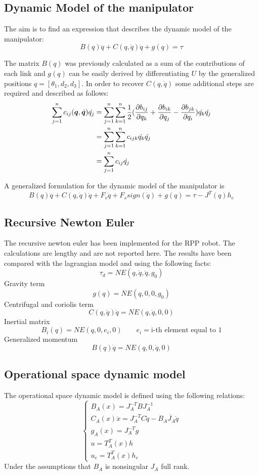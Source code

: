 \documentclass[a4paper,12pt]{article}
\newcommand*{\q}{\bm{q}}
\newcommand*{\dotq}{\dot{\q}}
\begin{document}
\subsection{Dynamic Model of the manipulator}
The aim is to find an expression that describes the dynamic model of the manipulator:
\[
    B(q)\ddot{q} + C(q, \dot{q})\dot{q} + g(q) = \tau
\]

\noindent The matrix $B(q)$ was previously calculated as a sum of the contributions of each link and $g(q)$ can be easily derived by differentiating $U$ by the generalized positions $q = [\theta_1,d_2, d_3]$. In order to recover $C(q,\dot{q})$ some additional steps are required and described as follows:
\begin{equation}
    \begin{aligned}
        \sum_{j=1}^{n} c_{ij}(\q, \dotq)\dot{q_j}  &= \sum_{j=1}^{n}\sum_{k=1}^{n} \frac{1}{2} (\pdv{b_{ij}}{q_k}+\pdv{b_{ik}}{q_j}-\pdv{b_{jk}}{q_i})\dot{q_k}\dot{q_j} \\
         &= \sum_{j=1}^{n}\sum_{k=1}^{n} c_{ijk}\dot{q_k}\dot{q_j} \\
         &= \sum_{j=1}^{n} c_{ij}\dot{q_j}
    \end{aligned}
\end{equation}

\noindent A generalized formulation for the dynamic model of the manipulator is
\[
    B(q)\ddot{q} + C(q, \dot{q})\dot{q} + F_v\dot{q} + F_ssign(\dot{q}) + g(q) = \tau - J^{T}(q)h_e  
\]
\subsection{Recursive Newton Euler}
The recursive newton euler has been implemented for the RPP robot. The calculations are lengthy and are not reported here. The results have been compared with the lagrangian model and using the following facts:
\bigskip
\[
    \tau_{d} = NE(q,\dot{q}, \ddot{q}, g_{0})
\]
\noindent Gravity term
\[
    g(q) = NE(q,0,0,g_0)
\]
Centrifugal and coriolis term
\[
    C(q,\dot{q})\dot{q} = NE(q,\dot{q},0,0)
\]
Inertial matrix
\[
    B_i(q) = NE(q,0,e_i,0) \qquad e_i = \text{i-th element equal to 1}
\]
Generalized momentum
\[
    B(q)\dot{q} = NE(q,0,\dot{q},0)
\]
\subsection{Operational space dynamic model}
The operational space dynamic model is defined using the following relations:
\[
    \begin{cases}
    B_{A}(x) = J_{A}^{-T}BJ_A^{-1} \\
    C_{A}(x)\dot{x} = J_{A}^{-T}C\dot{q} - B_{A}\dot{J_{A}}\dot{q} \\
    g_{A}(x) = J_{A}^{-T}g \\
    u = T_{A}^T(x) h \\
    u_e = T_{A}^T(x)h_{e}
    \end{cases}
\]
Under the assumptions that $B_{A}$ is nonsingular $J_{A}$ full rank.
\end{document}
